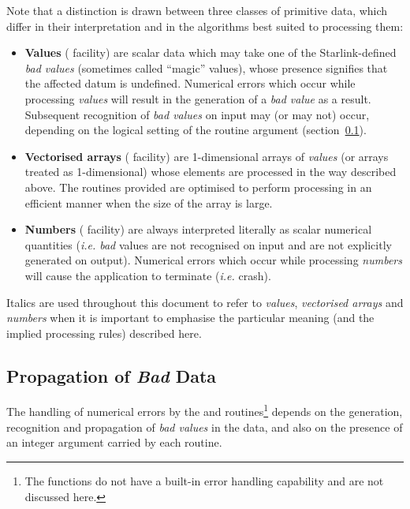 Note that a distinction is drawn between three classes of primitive data,
which differ in their interpretation and in the algorithms best suited to
processing them: 

\begin{itemize}

\item {\bf Values} ( facility) are scalar data which may take one
of the Starlink-defined {\em bad values} (sometimes called ``magic''
values), whose presence signifies that the affected datum is undefined. 
Numerical errors which occur while processing {\em values} will result in 
the generation of a {\em bad value} as a result.
Subsequent recognition of {\em bad values} on input may (or may not) occur,
depending on the logical setting of the  routine argument
(section~\ref{section:bad}). 

\item {\bf Vectorised arrays} ( facility) are 1-dimensional arrays
of {\em values} (or arrays treated as 1-dimensional) whose elements are
processed in the way described above. 
The routines provided are optimised to perform processing in an efficient
manner when the size of the array is large. 

\item {\bf Numbers} ( facility) are always interpreted literally
as scalar numerical quantities ({\em i.e. bad} values are not recognised on
input and are not explicitly generated on output). 
Numerical errors which occur while processing {\em numbers} will cause the
application to terminate ({\em i.e.} crash). 

\end{itemize}

Italics are used throughout this document to refer to {\em values}, {\em
vectorised arrays} and {\em numbers} when it is important to emphasise the
particular meaning (and the implied processing rules) described here. 

\subsection{Propagation of {\em Bad} Data}
\label{section:bad}

The handling of numerical errors by the  and 
routines\footnote{The  functions do not have a built-in error
handling capability and are not discussed here.}  depends on the generation,
recognition and propagation of {\em bad values} in the data, and also on
the presence of an integer  argument carried by each
routine. 

